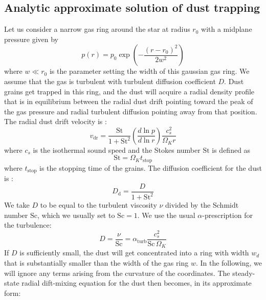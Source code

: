 \documentclass{aa}
\begin{document}
\subsection{Analytic approximate solution of dust trapping}
\label{sec-analytic-model-of-trapping}
%
Let us consider a narrow gas ring around the star at radius $r_0$ with a
midplane pressure given by
\begin{equation}\label{eq-gaussian-pressure-bump-repeat}
p(r) = p_0 \exp\left(-\frac{(r-r_0)^2}{2w^2}\right)
\end{equation}
where $w\ll r_0$ is the parameter setting the width of this gaussian gas ring.
We assume that the gas is turbulent with turbulent diffusion coefficient
$D$. Dust grains get trapped in this ring, and the dust will acquire a
radial density profile that is in equilibrium between the radial dust drift
pointing toward the peak of the gas pressure and radial turbulent diffusion
pointing away from that position. The radial dust drift velocity is
\citep[see e.g.][]{2010A&A...513A..79B}:
\begin{equation}\label{eq-v-radial-drift}
  v_{\mathrm{dr}} = \frac{\mathrm{St}}{1+\mathrm{St}^{2}}
  \left(\frac{d\ln p}{d\ln r}\right)\frac{c_s^2}{\Omega_Kr}
\end{equation}
where $c_s$ is the isothermal sound speed and the Stokes number $\mathrm{St}$ is
defined as
\begin{equation}\label{eq-definition-stokes-number}
\mathrm{St} = \Omega_Kt_{\mathrm{stop}}
\end{equation}
where $t_{\mathrm{stop}}$ is the stopping time of the grains. The diffusion
coefficient for the dust is \citep{2007Icar..192..588Y}:
\begin{equation}
D_{\mathrm{d}} = \frac{D}{1+\mathrm{St}^2}
\end{equation}
We take $D$ to be equal to the turbulent viscosity $\nu$ divided by the
Schmidt number $\mathrm{Sc}$, which we usually set to $\mathrm{Sc}=1$.
We use the usual $\alpha$-prescription for the turbulence:
\begin{equation}
D=\frac{\nu}{\mathrm{Sc}}= \alpha_{\mathrm{turb}}\frac{c_s^2}{\mathrm{Sc}\,\Omega_K}
\end{equation}
If $D$ is sufficiently small, the dust will get concentrated into a ring with
width $w_d$ that is substantially smaller than the width of the gas ring
$w$. In the following, we will ignore any terms
arising from the curvature of the coordinates. The steady-state radial
dift-mixing equation for the dust then becomes, in its approximate form:
\end{document}
